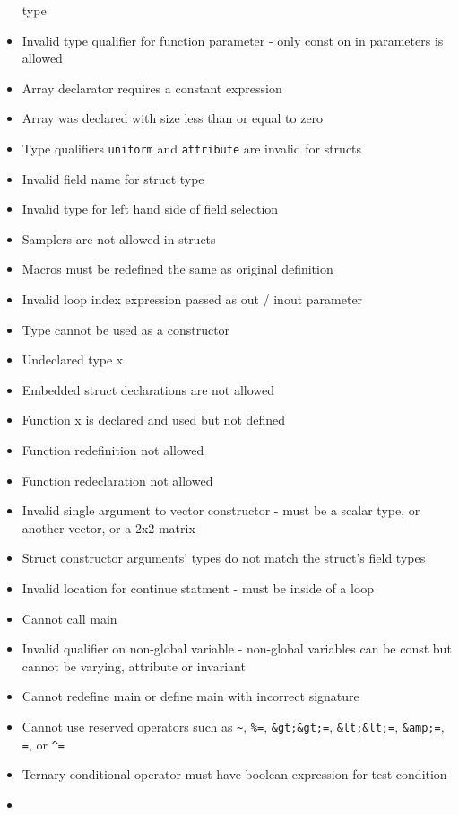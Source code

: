 \documentclass[]{article}
\begin{document}
\begin{itemize}
  type
\item
  Invalid type qualifier for function parameter - only const on in
  parameters is allowed
\item
  Array declarator requires a constant expression
\item
  Array was declared with size less than or equal to zero
\item
  Type qualifiers \texttt{uniform} and \texttt{attribute} are invalid
  for structs
\item
  Invalid field name for struct type
\item
  Invalid type for left hand side of field selection
\item
  Samplers are not allowed in structs
\item
  Macros must be redefined the same as original definition
\item
  Invalid loop index expression passed as out / inout parameter
\item
  Type cannot be used as a constructor
\item
  Undeclared type x
\item
  Embedded struct declarations are not allowed
\item
  Function x is declared and used but not defined
\item
  Function redefinition not allowed
\item
  Function redeclaration not allowed
\item
  Invalid single argument to vector constructor - must be a scalar type,
  or another vector, or a 2x2 matrix
\item
  Struct constructor arguments' types do not match the struct's field
  types
\item
  Invalid location for continue statment - must be inside of a loop
\item
  Cannot call main
\item
  Invalid qualifier on non-global variable - non-global variables can be
  const but cannot be varying, attribute or invariant
\item
  Cannot redefine main or define main with incorrect signature
\item
  Cannot use reserved operators such as \texttt{\textasciitilde{}},
  \texttt{\%=}, \texttt{\&gt;\&gt;=}, \texttt{\&lt;\&lt;=},
  \texttt{\&amp;=}, \texttt{\textbar{}=}, or \texttt{\^{}=}
\item
  Ternary conditional operator must have boolean expression for test
  condition
\item

\end{itemize}
\end{document}
